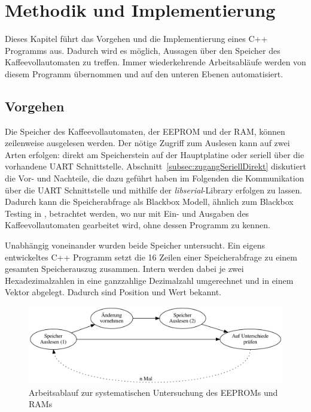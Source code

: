 \chapter{Methodik und Implementierung}\label{ch:MethodikUndImplementierung}
Dieses Kapitel führt das Vorgehen und die Implementierung eines C++ Programms aus.
Dadurch wird es möglich, Aussagen über den Speicher des Kaffeevollautomaten zu treffen.
Immer wiederkehrende Arbeitsabläufe werden von diesem Programm übernommen und auf den unteren Ebenen automatisiert.

\section{Vorgehen}\label{sec:Vorgehen}
Die Speicher des Kaffeevollautomaten, der \ac{EEPROM} und der \ac{RAM}, können zeilenweise ausgelesen werden.
Der nötige Zugriff zum Auslesen kann auf zwei Arten erfolgen: direkt am Speicherstein auf der Hauptplatine oder seriell über die vorhandene \ac{UART} Schnittstelle.
Abschnitt~\ref{subsec:zugangSeriellDirekt} diskutiert die Vor- und Nachteile, die dazu geführt haben im Folgenden die Kommunikation über die \ac{UART} Schnittstelle und mithilfe der \textit{libserial}-Library erfolgen zu lassen.
Dadurch kann die Speicherabfrage als Blackbox Modell, ähnlich zum Blackbox Testing in \cite{Solr-599853700}, betrachtet werden, wo nur mit Ein- und Ausgaben des Kaffeevollautomaten gearbeitet wird, ohne dessen Programm zu kennen.

Unabhängig voneinander wurden beide Speicher untersucht.
Ein eigens entwickeltes C++ Programm setzt die 16 Zeilen einer Speicherabfrage zu einem gesamten Speicherauszug zusammen.
Intern werden dabei je zwei Hexadezimalzahlen in eine ganzzahlige Dezimalzahl umgerechnet und in einem Vektor abgelegt.
Dadurch sind Position und Wert bekannt.

\begin{figure}
  \begin{center}
    \includegraphics[scale=0.6]{images/chapter_4/workflow}
    \caption{Arbeitsablauf zur systematischen Untersuchung des EEPROMs und RAMs}
    \label{fig:workflow}
  \end{center}
\end{figure}

